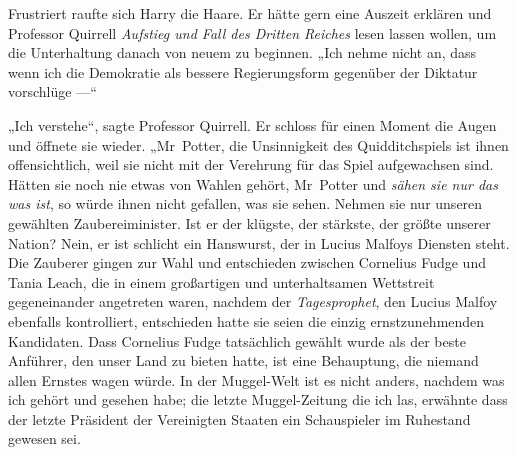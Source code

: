 Frustriert raufte sich Harry die Haare. Er hätte gern eine Auszeit erklären und Professor Quirrell \emph{Aufstieg und Fall des Dritten Reiches} lesen lassen wollen, um die Unterhaltung danach von neuem zu beginnen.
„Ich nehme nicht an, dass wenn ich die Demokratie als bessere Regierungsform gegenüber der Diktatur vorschlüge —“

„Ich verstehe“, sagte Professor Quirrell. Er schloss für einen Moment die Augen und öffnete sie wieder.
„Mr~Potter, die Unsinnigkeit des Quidditchspiels ist ihnen offensichtlich, weil sie nicht mit der Verehrung für das Spiel aufgewachsen sind. Hätten sie noch nie etwas von Wahlen gehört, Mr~Potter und \emph{sähen sie nur das was ist}, so würde ihnen nicht gefallen, was sie sehen. Nehmen sie nur unseren gewählten Zaubereiminister. Ist er der klügste, der stärkste, der größte unserer Nation? Nein, er ist schlicht ein Hanswurst, der in Lucius Malfoys Diensten steht. Die Zauberer gingen zur Wahl und entschieden zwischen Cornelius Fudge und Tania Leach, die in einem großartigen und unterhaltsamen Wettstreit gegeneinander angetreten waren, nachdem der \emph{Tagesprophet}, den Lucius Malfoy ebenfalls kontrolliert, entschieden hatte sie seien die einzig ernstzunehmenden Kandidaten. Dass Cornelius Fudge tatsächlich gewählt wurde als der beste Anführer, den unser Land zu bieten hatte, ist eine Behauptung, die niemand allen Ernstes wagen würde. In der Muggel-Welt ist es nicht anders, nachdem was ich gehört und gesehen habe; die letzte Muggel-Zeitung die ich las, erwähnte dass der letzte Präsident der Vereinigten Staaten ein Schauspieler im Ruhestand gewesen sei.%
